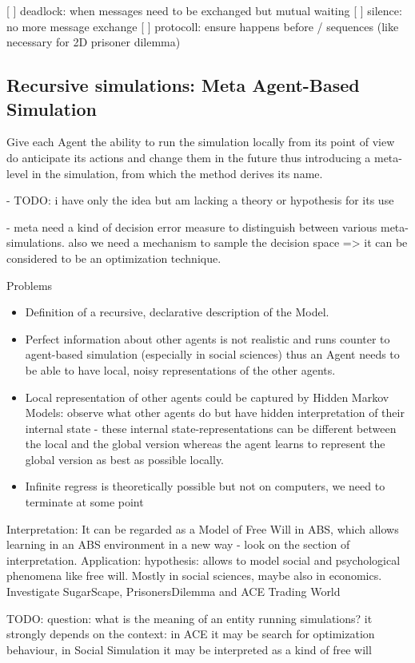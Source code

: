 [ ] deadlock: when messages need to be exchanged but mutual waiting
[ ] silence: no more message exchange
[ ] protocoll: ensure happens before / sequences (like necessary for 2D prisoner dilemma)

\subsection{Recursive simulations: Meta Agent-Based Simulation}
Give each  Agent the ability to run the simulation locally from its point of view do anticipate its actions and change them in the future thus introducing a meta-level in the simulation, from which the method derives its name.

- TODO:  i have only the idea but am lacking a theory or hypothesis for its use

- meta need a kind of decision error measure to distinguish between various meta-simulations. also we need a mechanism to sample the decision space => it can be considered to be an optimization technique.

Problems
\begin{itemize}
	\item Definition of a recursive, declarative description of the Model.
	\item Perfect information about other agents is not realistic and runs counter to agent-based simulation (especially in social sciences) thus an Agent needs to be able to have local, noisy representations of the other agents.
	\item Local representation of other agents could be captured by Hidden Markov Models: observe what other agents do but have hidden interpretation of their internal state - these internal state-representations can be different between the local and the global version whereas the agent learns to represent the global version as best as possible locally.
	\item Infinite regress is theoretically possible but not on computers, we need to terminate at some point
\end{itemize}

Interpretation: It can be regarded as a Model of Free Will in ABS, which allows learning in an ABS environment in a new way - look on the section of interpretation.
Application: hypothesis: allows to model social and psychological phenomena like free will. Mostly in social sciences, maybe also in economics. Investigate SugarScape, PrisonersDilemma and ACE Trading World

TODO: question: what is the meaning of an entity running simulations? it strongly depends on the context: in ACE it may be search for optimization behaviour, in Social Simulation it may be interpreted as a kind of free will

